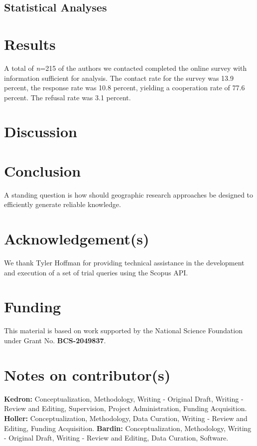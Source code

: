 \documentclass[]{interact}
\theoremstyle{plain}%
\theoremstyle{definition}
\theoremstyle{remark}
\begin{document}
\subsection*{Statistical Analyses}


\section*{Results}

A total of \textit{n}=215 of the authors we contacted completed the online survey with information sufficient for analysis. The contact rate for the survey was 13.9 percent, the response rate was 10.8 percent, yielding a cooperation rate of 77.6 percent. The refusal rate was 3.1 percent.   


\section*{Discussion}


\section*{Conclusion}
A standing question is how should geographic research approaches be designed to efficiently generate reliable knowledge.

\theendnotes


\section*{Acknowledgement(s)}
We thank Tyler Hoffman for providing technical assistance in the development and execution of a set of trial queries using the Scopus API.

\section*{Funding}
This material is based on work supported by the National Science Foundation under Grant No. \textbf{BCS-2049837}.

\section*{Notes on contributor(s)}
\textbf{Kedron:} Conceptualization, Methodology, Writing - Original Draft, Writing - Review and Editing, Supervision, Project Administration, Funding Acquisition. \textbf{Holler:} Conceptualization, Methodology, Data Curation, Writing - Review and Editing, Funding Acquisition. \textbf{Bardin:} Conceptualization, Methodology, Writing - Original Draft, Writing - Review and Editing, Data Curation, Software.
\end{document}
